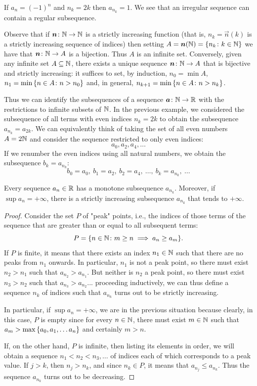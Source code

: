 \begin{example}
If $a_n = (-1)^n$ and $n_k=2k$ then $a_{n_k} = 1$.
We see that an irregular sequence
can contain a regular subsequence.
\end{example}

Observe that if $\boldsymbol n\colon {\mathbb N}\to {\mathbb N}$ is a
strictly increasing function
(that is, $n_k=\vec n(k)$ is a strictly increasing sequence of indices)
then setting $A=\boldsymbol n({\mathbb N})={\left\{ n_k\colon k\in {\mathbb N} \right\}}$ we have that
$\boldsymbol n \colon {\mathbb N} \to A$ is a bijection. Thus $A$ is an infinite set.
Conversely, given any infinite set $A\subseteq {\mathbb N}$, there exists a
unique sequence $\boldsymbol n\colon {\mathbb N} \to A$ that is bijective and strictly
increasing:
it suffices to set, by induction,
$n_0 = \min A$, $n_1 = \min {\left\{ n\in A \colon n > n_0 \right\}}$
and, in general,
 $n_{k+1} = \min{\left\{  n\in A \colon n > n_k \right\}}$.

Thus we can identify the subsequences of a sequence
$\boldsymbol a \colon {\mathbb N} \to {\mathbb R}$ with the restrictions to infinite subsets of ${\mathbb N}$.
In the previous example, we considered the subsequence
of all terms with even indices $n_k=2k$ to obtain the subsequence
$a_{n_k} = a_{2k}$. We can equivalently think of taking the set of
all even numbers $A=2{\mathbb N}$ and consider the sequence restricted to only
even indices:
\[
  a_0, a_2, a_4, \dots
\]
If we renumber the even indices using all natural numbers, we obtain
the subsequence $b_k=a_{n_k}$:
\[
  b_0 = a_0,\ b_1 = a_2,\ b_2 = a_4,\ \dots,\ b_k = a_{n_k},\ \dots
\]

\begin{lemma}%
\label{lem:estratte_monotone}%
Every sequence $a_n\in {\mathbb R}$ has a monotone subsequence $a_{n_k}$.
Moreover, if $\sup a_n = +\infty$, there is a strictly increasing subsequence
$a_{n_k}$
that tends to $+\infty$.
\end{lemma}
%
\begin{proof}
Consider the set $P$ of "peak" points, i.e., the indices
of those terms of the sequence that are greater than or equal to all subsequent
terms:
\[
  P = {\left\{ n\in {\mathbb N}\colon m\ge n \implies a_n\ge a_m \right\}}.
\]
If $P$ is finite,
it means that there exists an index $n_1\in {\mathbb N}$ such
that there are no peaks from $n_1$ onwards. In particular, $n_1$ is not a peak
point,
so there must exist $n_2>n_1$ such that $a_{n_2}>a_{n_1}$.
But neither is $n_2$ a peak point, so there must exist $n_3>n_2$ such
that $a_{n_3}>a_{n_2}$... proceeding inductively, we can thus define
a sequence $n_k$ of indices such that $a_{n_k}$ turns out to be strictly
increasing.

In particular, if $\sup a_n = +\infty$, we are in the previous situation
because clearly, in this case, $P$ is empty since for every $n\in {\mathbb N}$,
there must exist $m\in {\mathbb N}$ such that $a_m > \max{\left\{ a_0, a_1, \dots a_n \right\}}$
and certainly $m>n$.

If, on the other hand, $P$ is infinite, then listing its elements in order, we
will obtain
a sequence $n_1 < n_2 < n_3, \dots$ of indices each of which corresponds to a
peak value.
If $j>k$, then $n_j>n_k$, and since $n_k\in P$, it means that
$a_{n_j} \le a_{n_k}$.
Thus the sequence $a_{n_k}$ turns out to be decreasing.
\end{proof}


